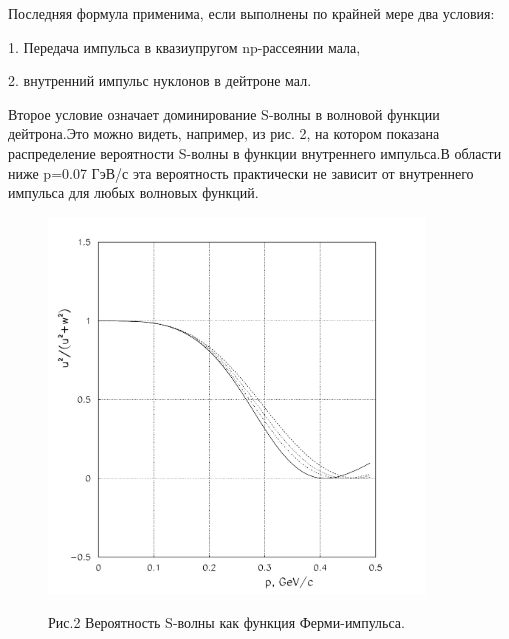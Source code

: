 \documentclass[a4paper,12pt]{article}
\begin{document}
{{    \vspace {7mm}

    Последняя формула применима, если выполнены по крайней мере
    два условия:

    \vspace {7mm}

    1. Передача импульса в квазиупругом np-рассеянии мала,

    \vspace {7mm}

    2. внутренний импульс нуклонов в дейтроне мал.

    \vspace {7mm}

    Второе условие означает доминирование S-волны в волновой функции
    дейтрона.Это можно видеть, например, из рис. 2, на котором
    показана распределение вероятности S-волны в функции внутреннего
    импульса.В области ниже p=0.07 ГэВ/с эта вероятность практически
    не зависит от внутреннего импульса для любых волновых функций.

    \vspace {7mm}

    \begin{figure}[hbt]
      \begin{center}
        \includegraphics[width=10cm]{wavedtr.pdf}
      \end{center}
      \vspace{0.4mm}
      Рис.2  Вероятность S-волны как функция Ферми-импульса.
    \end{figure}

    \vspace {7mm}

}}
\end{document}
